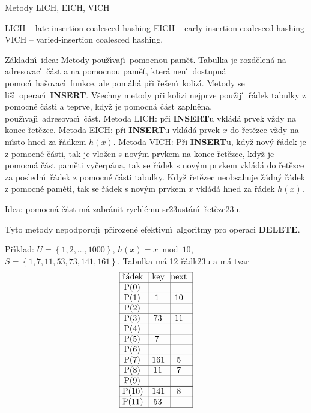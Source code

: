 \subhead
Metody LICH, EICH, VICH
\endsubhead

\phantom{---}LICH -- late-insertion coalesced hashing\newline 
\phantom{---}EICH -- early-insertion coalesced hashing\newline 
\phantom{---}VICH -- varied-insertion coalesced hashing.
\medskip

\flushpar Z\'akladn\'\i\ idea: Metody pou\v z\'\i vaj\'\i\ pomocnou pam\v e\v t. 
Tabulka je rozd\v elen\'a na adresovac\'\i\ \v c\'ast a na pomocnou 
pam\v e\v t, kter\'a nen\'\i\ dostupn\'a pomoc\'\i\ ha\v sovac\'\i\ funkce, 
ale pom\'ah\'a p\v ri \v re\v sen\'\i\ koliz\'\i . Metody se li\v s\'\i\ operac\'\i\ 
{\bf INSERT}. V\v sechny metody p\v ri kolizi nejprve pou\v zij\'\i\ \v r\'adek 
tabulky z pomocn\'e \v c\'asti a teprve, kdy\v z je pomocn\'a \v c\'ast 
zapln\v ena, pou\v z\'\i vaj\'\i\ adresovac\'\i\ \v c\'ast.\newline 
Metoda LICH: p\v ri {\bf INSERT}u vkl\'ad\'a prvek v\v zdy na konec 
\v re\-t\v ez\-ce.\newline 
Metoda EICH: p\v ri {\bf INSERT}u vkl\'ad\'a prvek $x$ do \v ret\v ezce v\v zdy 
na m\'\i sto hned za \v r\'adkem $h\left(x\right)$.\newline 
Metoda VICH: P\v ri {\bf INSERT}u, kdy\v z nov\'y \v r\'adek je z 
pomocn\'e \v c\'asti, tak je vlo\v zen s nov\'ym prvkem na konec 
\v ret\v ezce, kdy\v z je pomocn\'a \v c\'ast pam\v eti vy\v cer\-p\'a\-na, tak se 
\v r\'adek s nov\'ym prvkem vkl\'ad\'a do \v ret\v ezce za posled\-n\'\i\ 
\v r\'adek z pomocn\'e \v c\'asti tabulky. Kdy\v z \v ret\v ezec neobsahuje 
\v z\'adn\'y \v r\'adek z pomocn\'e pam\v eti, tak se \v r\'adek s nov\'ym  prvkem $x$ vkl\'ad\'a hned za \v r\'adek $h\left(x\right)$. 
\medskip

\flushpar Idea: pomocn\'a \v c\'ast m\'a zabr\'anit rychl\'emu 
sr\accent23ust\'an\'\i\ \v ret\v ezc\accent23u.
\medskip

\flushpar Tyto metody nepodporuj\'\i\ p\v rirozen\'e efektivn\'\i\ algoritmy 
pro ope\-raci {\bf DELETE}.

\flushpar P\v r\'\i klad: $U=\left\{1,2,\dots,1000\right\}$, $h\left(x\right)=x\bmod10$,\newline 
$S=\left\{1,7,11,53,73,141,161\right\}$. Tabulka m\'a 12 \v r\'adk\accent23u a 
m\'a tvar
$$\vtop{\offinterlineskip\halign {\strut\vrule\ # & \vrule\ # & \vrule \hfil # \hfil \vrule\cr\noalign{\hrule}\v r\'adek & key & next \hfil \cr\noalign{\hrule}P(0) & &\hfill \cr\noalign{\hrule}P(1) & 1 & 10 \cr\noalign{\hrule}P(2) & &\hfill \cr\noalign{\hrule}P(3) & 73 & 11 \cr\noalign{\hrule}P(4) &  &\hfill \cr\noalign{\hrule}P(5) & 7 & \hfill \cr\noalign{\hrule}P(6) & &\hfill \cr\noalign{\hrule}P(7) & 161 & 5 \cr\noalign{\hrule}P(8) & 11 & 7 \cr\noalign{\hrule}P(9) & &\hfill \cr\noalign{\hrule}\noalign{\hrule}P(10) & 141 & 8 \cr\noalign{\hrule}P(11) & 53 & \cr\noalign{\hrule}}}$$

